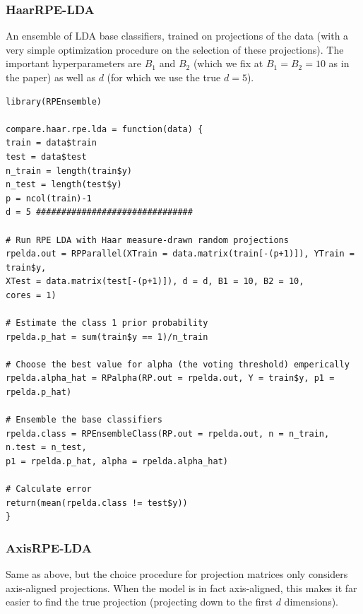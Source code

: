 \documentclass{amsart}
\begin{document}
\subsubsection{HaarRPE-LDA}

An ensemble of LDA base classifiers, trained on projections of the
data (with a very simple optimization procedure on the selection of
these projections). The important hyperparameters are $B_{1}$ and
$B_{2}$ (which we fix at $B_{1}=B_{2}=10$ as in the paper) as well
as $d$ (for which we use the true $d=5$).

\begin{lstlisting}[caption=Modular RPE-H with LDA testing code]
library(RPEnsemble)

compare.haar.rpe.lda = function(data) {
train = data$train
test = data$test
n_train = length(train$y)
n_test = length(test$y)
p = ncol(train)-1
d = 5 ###############################

# Run RPE LDA with Haar measure-drawn random projections
rpelda.out = RPParallel(XTrain = data.matrix(train[-(p+1)]), YTrain = train$y,
XTest = data.matrix(test[-(p+1)]), d = d, B1 = 10, B2 = 10,
cores = 1)

# Estimate the class 1 prior probability
rpelda.p_hat = sum(train$y == 1)/n_train

# Choose the best value for alpha (the voting threshold) emperically
rpelda.alpha_hat = RPalpha(RP.out = rpelda.out, Y = train$y, p1 = rpelda.p_hat)

# Ensemble the base classifiers
rpelda.class = RPEnsembleClass(RP.out = rpelda.out, n = n_train, n.test = n_test,
p1 = rpelda.p_hat, alpha = rpelda.alpha_hat)

# Calculate error
return(mean(rpelda.class != test$y))
}
\end{lstlisting}



\subsubsection{AxisRPE-LDA}

Same as above, but the choice procedure for projection matrices only
considers axis-aligned projections. When the model is in fact axis-aligned,
this makes it far easier to find the true projection (projecting down
to the first $d$ dimensions).
\end{document}
